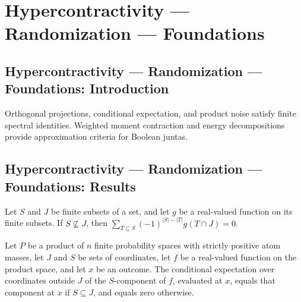 \section{Hypercontractivity --- Randomization --- Foundations}
\subsection*{Hypercontractivity --- Randomization --- Foundations: Introduction}
Orthogonal projections, conditional expectation, and product noise satisfy finite spectral identities. Weighted moment contraction and energy decompositions provide approximation criteria for Boolean juntas.

\subsection*{Hypercontractivity --- Randomization --- Foundations: Results}

\begin{theorem}
\leanok
{}
Let $S$ and $J$ be finite subsets of a set, and let $g$ be a real-valued function on its
finite subsets. If $S\nsubseteq J$, then $\sum_{T\subseteq S}(-1)^{|S|-|T|}g(T\cap
J)=0$.
\end{theorem}

\begin{theorem}
\leanok
{}
Let $P$ be a product of $n$ finite probability spaces with strictly positive atom
masses, let $J$ and $S$ be sets of coordinates, let $f$ be a real-valued function on the
product space, and let $x$ be an outcome. The conditional expectation over coordinates
outside $J$ of the $S$-component of $f$, evaluated at $x$, equals that component at $x$
if $S\subseteq J$, and equals zero otherwise.
\end{theorem}

